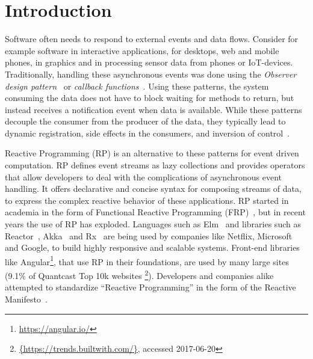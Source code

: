 \section{Introduction}

Software often needs to respond to external events and data flows.
Consider for example software in interactive applications, for desktops,
web and mobile phones, in graphics and in processing sensor data from
phones or IoT-devices.  Traditionally, handling these asynchronous
events was done using the \emph{Observer design pattern}~\cite{johnson1995design}
or \emph{callback functions}~\cite{gallaba2015don}.  Using these
patterns, the system consuming the data does not have to block waiting
for methods to return, but instead receives a notification event when
data is available.  While these patterns decouple the consumer from the
producer of the data, they typically lead to dynamic registration, side
effects in the consumers, and inversion of control~\cite{salvaneschi2014empirical,edwards2009coherent}.

Reactive Programming (RP) is an alternative to these patterns for event
driven computation.  RP defines event streams as lazy collections and
provides operators that allow developers to deal with the complications
of asynchronous event handling.  It offers declarative and concise
syntax for composing streams of data, to express the complex reactive
behavior of these applications.  RP started in academia in the form of
Functional Reactive Programming (FRP)~\cite{elliott1997functional,elliott2009push,czaplicki2013asynchronous,maier2010deprecating,meyerovich2009flapjax},
but in recent years the use of RP has exploded.  Languages such as Elm~\cite
{czaplicki2012elm} and libraries such as Reactor~\cite{Gutierrez2017},
Akka~\cite{klangakka} and Rx~\cite{meijer2010subject} are being used by
companies like Netflix, Microsoft and Google, to build highly responsive
and scalable systems.  Front-end libraries like Angular\footnote{\url{https://angular.io/}},
that use RP in their foundations, are used by many large sites (9.1\% of Quantcast
Top 10k websites%
\footnote{\url{{https://trends.builtwith.com/}}, accessed 2017-06-20}).
Developers and companies alike attempted to standardize ``Reactive
Programming'' in the form of the Reactive Manifesto~\cite{boner2014reactive}.

